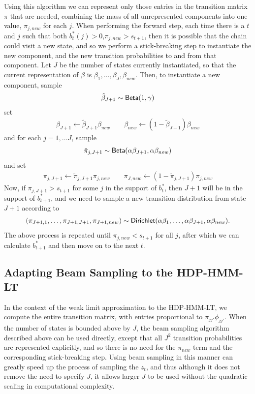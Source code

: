 Using this algorithm we can represent only those entries in the
transition matrix $\pi$ that are needed, combining the mass of all
unrepresented components into one value, $\pi_{j,new}$ for each
$j$.  When performing the forward step, each time there is a $t$ and
$j$ such that both $b^*_{t}(j) > 0$,$\pi_{j,new} > s_{t+1}$, then it is possible that the chain could visit a
new state, and so we perform a stick-breaking step to instantiate the
new component, and the new transition probabilities to and from that
component.  Let $J$ be the number of states currently instantiated, so
that the current representation of $\beta$ is $\beta_1, \dots,
\beta_J, \beta_{new}$.  Then, to instantiate a new component, sample
\begin{align}
  \tilde{\beta}_{J+1} \sim \mathsf{Beta}(1,\gamma)
\end{align}
set
\begin{align}
  \beta_{J+1} \gets \tilde{\beta}_{J+1} \beta_{new} \qquad \beta_{new}
  \gets (1 - \tilde{\beta}_{J+1}) \beta_{new}
\end{align}
and for each $j = 1, \dots J$, sample
\begin{align}
  \tilde{\pi}_{j,J+1} \sim \mathsf{Beta}(\alpha \beta_{J+1},\alpha \beta_{new})
\end{align}
and set
\begin{align}
  \pi_{j,J+1} \gets \tilde{\pi}_{j,J+1} \pi_{j,new} \qquad \pi_{J,new}
  \gets (1 - \tilde{\pi}_{j,J+1}) \pi_{j,new}
\end{align}
Now, if $\pi_{j,J+1} > s_{t+1}$ for some $j$ in the support of
$b^*_t$, then $J+1$ will be in the support of $b^*_{t+1}$, and we need
to sample a new transition distribution from state $J+1$ according to
\begin{align}
  (\pi_{J+1,1}, \dots, \pi_{J+1,J+1}, \pi_{J+1,new}) \sim \mathsf{Dirichlet}(\alpha
    \beta_1, \dots, \alpha \beta_{J+1}, \alpha \beta_{new}).
\end{align}
The above process is repeated until $\pi_{j,new} < s_{t+1}$ for all $j$,
after which we can calculate $b^*_{t+1}$ and then move on to the next $t$.

\subsection{Adapting Beam Sampling to the HDP-HMM-LT}
\label{sec:adapt-beam-sampl}

In the context of the weak limit approximation to the HDP-HMM-LT, we compute the entire transition matrix, with entries proportional to $\pi_{jj'}\phi_{jj'}$.  When the number of states is bounded above by $J$, the beam sampling algorithm described above can be used directly, except that all $J^2$ transition probabilities are represented explicitly, and so there is no need for the $\pi_{new}$ term and the corresponding stick-breaking step.  Using beam sampling in this manner can greatly speed up the process of sampling the $z_t$, and thus although it does not remove the need to specify $J$, it allows larger $J$ to be used without the quadratic scaling in computational complexity.

